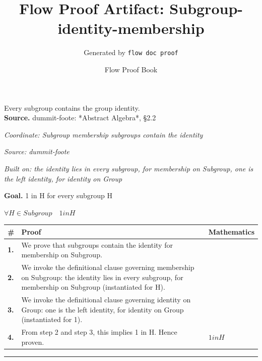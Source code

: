 \documentclass[11pt]{article}
\title{Flow Proof Artifact: Subgroup-identity-membership}
\author{Generated by \texttt{flow doc proof}}
\date{Flow Proof Book}
\theoremstyle{definition}
\begin{document}
\maketitle
Every subgroup contains the group identity.\\[0.5em]
\textbf{Source.} dummit-foote: *Abstract Algebra*, §2.2\\[0.5em]
\bigskip
{}\par
\smallskip\noindent\textit{Coordinate: Subgroup \cdot membership \cdot subgroups contain the identity}\par
\smallskip\noindent\textit{Source: dummit-foote}\par
\smallskip\noindent\textit{Built on: the identity lies in every subgroup, for membership on Subgroup, one is the left identity, for identity on Group}\par
\medskip
\noindent\textbf{Goal.} 1 in H for every subgroup H\par
\noindent$\displaystyle \forall H \in Subgroup\quad 1 in H$\par
\medskip
\noindent
\begin{tabular}{@{} >{\raggedright\arraybackslash}p{} >{\raggedright\arraybackslash}p{} >{\raggedleft\arraybackslash}p{} @{}}
\textbf{\#} & \textbf{Proof} & \textbf{Mathematics} \\
\midrule
\textbf{1.} & We prove that subgroups contain the identity for membership on Subgroup. & \\[0.45em]
\textbf{2.} & We invoke the definitional clause governing membership on Subgroup: the identity lies in every subgroup, for membership on Subgroup (instantiated for H). & \\[0.45em]
\textbf{3.} & We invoke the definitional clause governing identity on Group: one is the left identity, for identity on Group (instantiated for 1). & \\[0.45em]
\textbf{4.} & From step 2 and step 3, this implies 1 in H. Hence proven. & $\displaystyle 1 in H$ \\[0.45em]
\bottomrule
\end{tabular}
\label{thm:Subgroup-membership-subgroups_contain_the_identity}
\par\medskip\hrule
\end{document}
